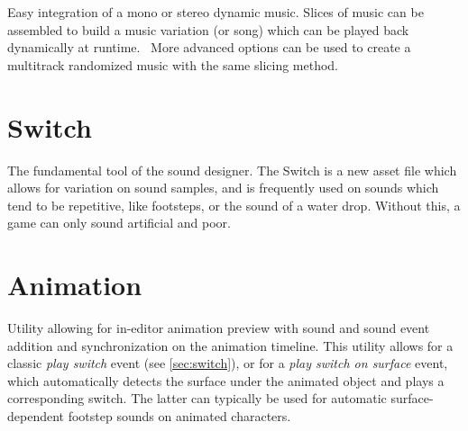 \documentclass[a4paper,10pt]{article}
\begin{document}
Easy integration of a mono or stereo dynamic music. Slices of music can be assembled to build a music variation (or song) which can be played back dynamically at runtime.\
More advanced options can be used to create a multitrack randomized music with the same slicing method.


\section{Switch} \label{sec:switch}

The fundamental tool of the sound designer. The Switch is a new asset file which allows for variation on sound samples, and is frequently used on sounds which tend to be repetitive, like footsteps, or the sound of a water drop. Without this, a game can only sound artificial and poor.


\section{Animation}

Utility allowing for in-editor animation preview with sound and sound event addition and synchronization on the animation timeline. This utility allows for a classic \textit{play switch} event (see \autoref{sec:switch}), or for a \textit{play switch on surface} event, which automatically detects the surface under the animated object and plays a corresponding switch. The latter can typically be used for automatic surface-dependent footstep sounds on animated characters.
\end{document}
